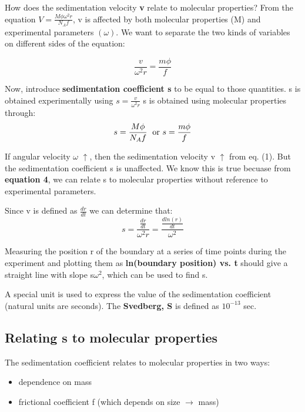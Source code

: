 \documentclass[12pt, letterpaper]{article}
\begin{document}
    How does the sedimentation velocity \textbf{v} relate to molecular properties? From the equation
    \(V = \frac{M\phi\omega^2 r}{N_Af}\), v is affected by both molecular properties (M) and experimental
    parameters $(\omega)$. We want to separate the two kinds of variables on different sides of the equation: 

    \begin{equation}
        \frac{v}{\omega^2 r} = \frac{m\phi}{f}
    \end{equation}


    Now, introduce \textbf{sedimentation coefficient s} to be equal to those quantities. s is obtained experimentally using \(s = \frac{v}{\omega^2 r} \)
    s is obtained using molecular properties through:
    \begin{equation}
        s = \frac{M\phi}{N_Af} \; \text{ or } \useshortskip s = \frac{m\phi}{f}
    \end{equation}

    If angular velocity $\omega$ $\uparrow$, then the sedimentation velocity v $\uparrow$ from eq. (1). But the sedimentation coefficient s
    is unaffected. We know this is true becuase from \textbf{equation 4}, we can relate s to molecular properties without reference to 
    experimental parameters. 
    
    Since v is defined as \( \frac{dr}{dt}\) we can determine that: \\
    \begin{equation}
        s = \frac{\frac{dr}{dt} }{\omega^2 r} = \frac{\frac{dln(r)}{dt}}{\omega^2}
    \end{equation}

    Measuring the position r of the boundary at a series of time points during the experiment and plotting them as 
    \textbf{ln(boundary position) vs. t}  should give a straight line with slope s$\omega^2$, which can be used to find s.

    A special unit is used to express the value of the sedimentation coefficient (natural units are seconds). 
    The \textbf{Svedberg, S} is defined as $10^{-13}$ sec. 

    \subsection*{Relating s to molecular properties}

    The sedimentation coefficient relates to molecular properties in two ways: 
    \begin{itemize}
        \item dependence on mass
        \item frictional coefficient f (which depends on size $\rightarrow$ mass)
    \end{itemize}
\end{document}
